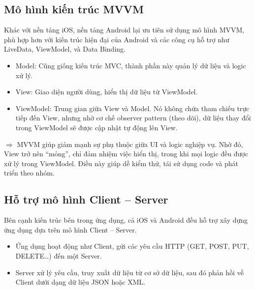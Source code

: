 \subsection{Mô hình kiến trúc MVVM}
\renewcommand{\labelitemi}{--}    
    \begin{flushleft}
        \hspace*{0.8cm}Khác với nền tảng iOS,  nền tảng Android lại ưu tiên sử dụng mô hình MVVM, phù hợp hơn với kiến trúc hiện đại của Android và các công cụ hỗ trợ như LiveData, ViewModel, và Data Binding.
        \setlength{\leftmargini}{1.5cm}
        \begin{itemize}
            \item Model: Cũng giống kiến trúc MVC, thành phần này quản lý dữ liệu và logic xử lý.
            \item View: Giao diện người dùng, hiển thị dữ liệu từ ViewModel.
            \item ViewModel: Trung gian giữa View và Model. Nó không chứa tham chiếu trực tiếp đến View, nhưng nhờ cơ chế observer pattern (theo dõi), dữ liệu thay đổi trong ViewModel sẽ được cập nhật tự động lên View.
        \end{itemize}
    \end{flushleft}
    \begin{flushleft}
      \hspace*{0.8cm}$\Rightarrow$ MVVM giúp giảm mạnh sự phụ thuộc giữa UI và logic nghiệp vụ. Nhờ đó, View trở nên “mỏng”, chỉ đảm nhiệm việc hiển thị, trong khi mọi logic đều được xử lý trong ViewModel. Điều này giúp dễ kiểm thử, tái sử dụng code và phát triển theo nhóm.
    \end{flushleft}

\subsection{Hỗ trợ mô hình Client – Server}
\renewcommand{\labelitemi}{--}    
    \begin{flushleft}
        \hspace*{0.8cm}Bên cạnh kiến trúc bên trong ứng dụng, cả iOS và Android đều hỗ trợ xây dựng ứng dụng dựa trên mô hình Client – Server.
        \setlength{\leftmargini}{1.5cm}
        \begin{itemize}
            \item Ứng dụng hoạt động như Client, gửi các yêu cầu HTTP (GET, POST, PUT, DELETE…) đến một Server.
            \item Server xử lý yêu cầu, truy xuất dữ liệu từ cơ sở dữ liệu, sau đó phản hồi về Client dưới dạng dữ liệu JSON hoặc XML.
        \end{itemize}
    \end{flushleft}

